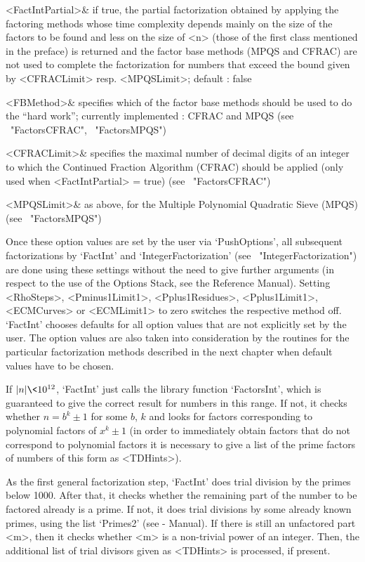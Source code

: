   <FactIntPartial>& if true, the partial factorization obtained
   by applying the factoring methods whose time complexity depends
   mainly on the size of the factors to be found and less
   on the size of <n> (those of the first class mentioned
   in the preface) is returned and the factor base methods
   (MPQS and CFRAC) are not used to complete the factorization
   for numbers that exceed the bound given by <CFRACLimit> 
   resp. <MPQSLimit>; default : false

   <FBMethod>& specifies which of the factor base methods should be
   used to do the ``hard work''; currently implemented : CFRAC and MPQS
   (see ~"FactorsCFRAC", ~"FactorsMPQS")

   <CFRACLimit>& specifies the maximal number of decimal digits of
   an integer to which the Continued Fraction Algorithm (CFRAC) 
   should be applied (only used when <FactIntPartial> = true)
   (see ~"FactorsCFRAC")

   <MPQSLimit>& as above, for the Multiple Polynomial Quadratic 
   Sieve (MPQS) (see ~"FactorsMPQS")
\enditems

Once these option values are set by the user via `PushOptions',
all subsequent factorizations
by `FactInt' and `IntegerFactorization' (see ~"IntegerFactorization")
are done using these settings without the need
to give further arguments (in respect to the use of the
{\GAP} Options Stack, see the Reference Manual).
Setting <RhoSteps>, <Pminus1Limit1>, <Pplus1Residues>, <Pplus1Limit1>,
<ECMCurves> or <ECMLimit1> to zero switches the respective method off.
`FactInt' chooses defaults for all option values that are 
not explicitly set by the user.
The option values are also taken into consideration by the routines for
the particular factorization methods described in the next chapter
when default values have to be chosen. 

If $|n| \< 10^{12}$, `FactInt' just calls the library function
`FactorsInt', which is guaranteed to give the correct result for
numbers in this range. If not, it checks whether $n = b^k \pm 1$ for 
some $b$, $k$ and looks for factors corresponding to
polynomial factors of $x^k \pm 1$ (in order to immediately 
obtain factors that do not correspond to polynomial factors  
it is necessary to give a list of the prime factors of numbers
of this form as <TDHints>).  

As the first general factorization step, `FactInt' does 
trial division by the primes below 1000. 
After that, it checks whether the remaining
part of the number to be factored already is a prime.
If not, it does trial divisions by some already known primes, using
the list `Primes2' (see {\GAP} - Manual).
If there is still an unfactored part <m>, then it checks whether <m>
is a non-trivial power of an integer.
Then, the additional list of trial divisors given
as <TDHints> is processed, if present.

